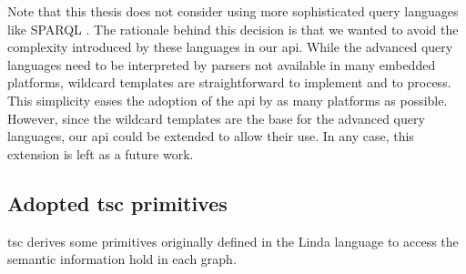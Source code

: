 


Note that this thesis does not consider using more sophisticated query languages like SPARQL . %
The rationale behind this decision is that we wanted to avoid the complexity introduced by these languages in our \ac{api}.
While the advanced query languages need to be interpreted by parsers not available in many embedded platforms,
wildcard templates are straightforward to implement and to process.
This simplicity eases the adoption of the \ac{api} by as many platforms as possible.
However, since the wildcard templates are the base for the advanced query languages, our \ac{api} could be extended to allow their use.
In any case, this extension is left as a future work.



\subsection{Adopted \acs{tsc} primitives}
\label{sec:primitives}

\acs{tsc} derives some primitives originally defined in the Linda language \citep{gelernter_generative_1985} to access the semantic information hold in each graph.

